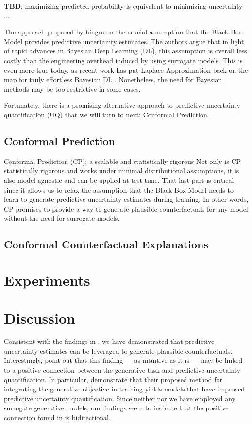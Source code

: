 \documentclass{article}
\begin{document}
\textbf{TBD}: maximizing predicted probability is equivalent to minimizing uncertainty ... 

The approach proposed by \citet{schut2021generating} hinges on the crucial assumption that the Black Box Model provides predictive uncertainty estimates. The authors argue that in light of rapid advances in Bayesian Deep Learning (DL), this assumption is overall less costly than the engineering overhead induced by using surrogate models. This is even more true today, as recent work has put Laplace Approximation back on the map for truly effortless Bayesian DL \citep{immer2020improving,daxberger2021laplace,antoran2023sampling}. Nonetheless, the need for Bayesian methods may be too restrictive in some cases. 

Fortunately, there is a promising alternative approach to predictive uncertainty quantification (UQ) that we will turn to next: Conformal Prediction. 

\subsection{Conformal Prediction}

Conformal Prediction (CP): a scalable and statistically rigorous  Not only is CP statistically rigorous and works under minimal distributional assumptions, it is also model-agnostic and can be applied at test time. That last part is critical since it allows us to relax the assumption that the Black Box Model needs to learn to generate predictive uncertainty estimates during training. In other words, CP promises to provide a way to generate plausible counterfactuals for any model without the need for surrogate models. 

\subsection{Conformal Counterfactual Explanations}



\section{Experiments}

\section{Discussion}

Consistent with the findings in \citet{schut2021generating}, we have demonstrated that predictive uncertainty estimates can be leveraged to generate plausible counterfactuals. Interestingly, \citet{schut2021generating} point out that this finding --- as intuitive as it is --- may be linked to a positive connection between the generative task and predictive uncertainty quantification. In particular, \citet{grathwohl2020your} demonstrate that their proposed method for integrating the generative objective in training yields models that have improved predictive uncertainty quantification. Since neither \citet{schut2021generating} nor we have employed any surrogate generative models, our findings seem to indicate that the positive connection found in \citet{grathwohl2020your} is bidirectional.
\end{document}
